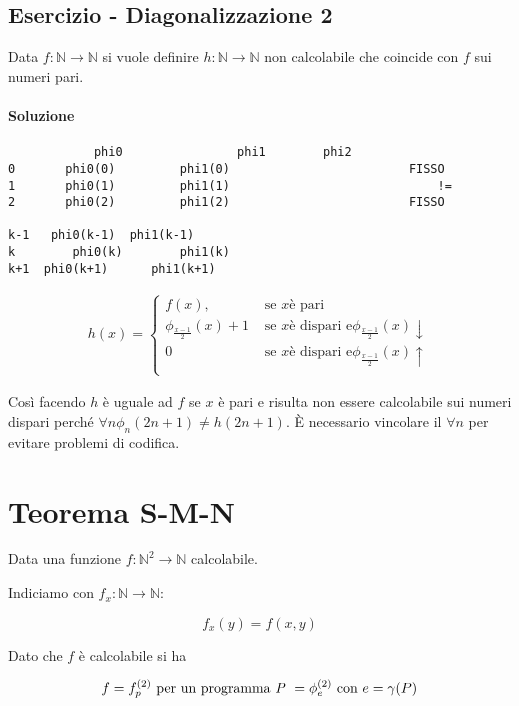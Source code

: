 \subsection{Esercizio - Diagonalizzazione 2}

Data $ f : \mathbb{N} \rightarrow \mathbb{N} $ si vuole definire $ h : \mathbb{N} \rightarrow \mathbb{N} $ non calcolabile che coincide con $ f $ sui numeri pari.

\paragraph{Soluzione}

\begin{verbatim}
			phi0 				phi1		phi2
0		phi0(0)			phi1(0)							FISSO
1       phi0(1)         phi1(1)								!=
2       phi0(2)         phi1(2)							FISSO
			
k-1   phi0(k-1)  phi1(k-1)
k        phi0(k)		phi1(k)
k+1  phi0(k+1)		phi1(k+1)
\end{verbatim}

\begin{align*}
h(x) = \begin{cases}
f(x), &\text{ se } x \text{è pari} \\
\phi_{\frac{x-1}{2}}(x) +1 &\text{ se } x \text{è dispari e} \phi_{\frac{x-1}{2}}(x) \downarrow \\
0 &\text{ se } x \text{è dispari e} \phi_{\frac{x-1}{2}}(x) \uparrow \\
\end{cases}
\end{align*}

Così facendo $ h $ è uguale ad $ f $ se $ x $ è pari e risulta non essere calcolabile sui numeri dispari perché $ \forall n \phi_n(2n+1) \neq h(2n+1) $. \`{E} necessario vincolare il $ \forall n $ per evitare problemi di codifica.

\section{Teorema S-M-N}

Data una funzione $ f : \mathbb{N}^2 \rightarrow \mathbb{N} $ calcolabile.

Indiciamo con $ f_x : \mathbb{N} \rightarrow \mathbb{N}$:

$$
f_x (y) = f(x,y)
$$

Dato che $ f $ è calcolabile si ha

$$
f = f_{p}^{(2)} \text{ per un programma \textit{P} } = \phi_{e}^{(2)} \text{ con } e = \gamma(P)
$$

